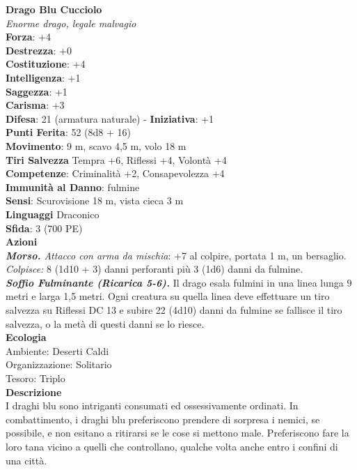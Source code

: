 \begin{multicols}{2}
\medskip\textbf{Drago Blu Cucciolo}\\
\emph{Enorme drago, legale malvagio}\\
\textbf{Forza}: +4\\
\textbf{Destrezza}: +0\\
\textbf{Costituzione}: +4\\
\textbf{Intelligenza}: +1\\
\textbf{Saggezza}: +1\\
\textbf{Carisma}: +3\\
\textbf{Difesa}: 21 (armatura naturale) - \textbf{Iniziativa}: +1\\
\textbf{Punti Ferita}: 52 (8d8 + 16)\\
\textbf{Movimento}: 9 m, scavo 4,5 m, volo 18 m\\
\textbf{Tiri Salvezza} Tempra +6, Riflessi +4, Volontà +4\\
\textbf{Competenze}: Criminalità +2, Consapevolezza +4\\
\textbf{Immunità al Danno}: fulmine\\
\textbf{Sensi}: Scurovisione 18 m, vista cieca 3 m\\
\textbf{Linguaggi} Draconico\\
\textbf{Sfida}: 3 (700 PE)\smallskip\\
\smallskip\textbf{Azioni}\\
\emph{\textbf{Morso.} Attacco con arma da mischia}: +7 al colpire, portata 1 m, un bersaglio.\\
\emph{Colpisce:} 8 (1d10 + 3) danni perforanti più 3 (1d6) danni da fulmine.\\
\emph{\textbf{Soffio Fulminante (Ricarica 5-6).}} Il drago esala fulmini in una linea lunga 9 metri e larga 1,5 metri. Ogni creatura su quella linea deve effettuare un tiro salvezza su Riflessi DC  13 e subire 22 (4d10) danni da fulmine se fallisce il tiro salvezza, o la metà di questi danni se lo riesce.\\
\textbf{Ecologia}\\
Ambiente: Deserti Caldi\\
Organizzazione: Solitario\\
Tesoro: Triplo\\
\textbf{Descrizione}\\
I draghi blu sono intriganti consumati ed ossessivamente ordinati. In combattimento, i draghi blu preferiscono prendere di sorpresa i nemici, se possibile, e non esitano a ritirarsi se le cose si mettono male. Preferiscono fare la loro tana vicino a quelli che controllano, qualche volta anche entro i confini di una città.\\



\end{multicols}
